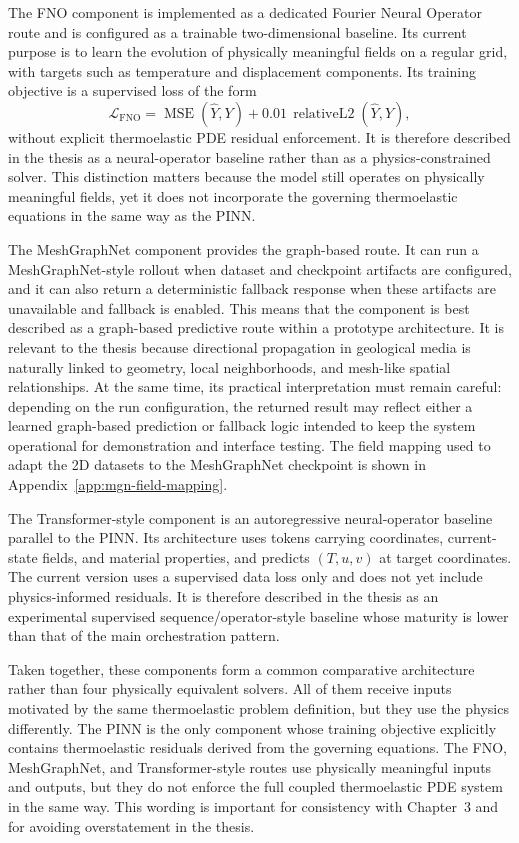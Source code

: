 The FNO component is implemented as a dedicated Fourier Neural Operator route and is configured as a trainable two-dimensional baseline. Its current purpose is to learn the evolution of physically meaningful fields on a regular grid, with targets such as temperature and displacement components. Its training objective is a supervised loss of the form
\begin{equation}
\mathcal{L}_{\mathrm{FNO}}
=
\operatorname{MSE}(\widehat{Y},Y)
+ 0.01 \, \operatorname{relativeL2}(\widehat{Y},Y),
\end{equation}
without explicit thermoelastic PDE residual enforcement. It is therefore described in the thesis as a neural-operator baseline rather than as a physics-constrained solver. This distinction matters because the model still operates on physically meaningful fields, yet it does not incorporate the governing thermoelastic equations in the same way as the PINN.

The MeshGraphNet component provides the graph-based route. It can run a MeshGraphNet-style rollout when dataset and checkpoint artifacts are configured, and it can also return a deterministic fallback response when these artifacts are unavailable and fallback is enabled. This means that the component is best described as a graph-based predictive route within a prototype architecture. It is relevant to the thesis because directional propagation in geological media is naturally linked to geometry, local neighborhoods, and mesh-like spatial relationships. At the same time, its practical interpretation must remain careful: depending on the run configuration, the returned result may reflect either a learned graph-based prediction or fallback logic intended to keep the system operational for demonstration and interface testing. The field mapping used to adapt the 2D datasets to the MeshGraphNet checkpoint is shown in Appendix~\ref{app:mgn-field-mapping}.

The Transformer-style component is an autoregressive neural-operator baseline parallel to the PINN. Its architecture uses tokens carrying coordinates, current-state fields, and material properties, and predicts \((T, u, v)\) at target coordinates. The current version uses a supervised data loss only and does not yet include physics-informed residuals. It is therefore described in the thesis as an experimental supervised sequence/operator-style baseline whose maturity is lower than that of the main orchestration pattern.

Taken together, these components form a common comparative architecture rather than four physically equivalent solvers. All of them receive inputs motivated by the same thermoelastic problem definition, but they use the physics differently. The PINN is the only component whose training objective explicitly contains thermoelastic residuals derived from the governing equations. The FNO, MeshGraphNet, and Transformer-style routes use physically meaningful inputs and outputs, but they do not enforce the full coupled thermoelastic PDE system in the same way. This wording is important for consistency with Chapter~3 and for avoiding overstatement in the thesis.

